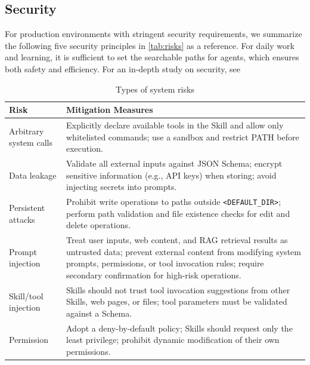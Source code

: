 \documentclass[]{article}
\newcommand{\passthrough}[1]{#1}
\newcommand{\qe}[1]{\passthrough{\lstinline!#1!}}
\begin{document}
\subsection{Security}\label{security}

For production environments with stringent security requirements, we
summarize the following five security principles in \autoref{tab:risks} as a reference. For daily work and
learning, it is sufficient to set the searchable paths for agents, which
ensures both safety and efficiency. For an in-depth study on security, see \cite{schmotz2025agent,jiang2026sok,ling2026agent,liu2026malicious,schmotz2026}

\begin{longtable}[]{@{}
  >{\raggedright\arraybackslash}p{}
  >{\raggedright\arraybackslash}p{}@{}}
\caption{Types of system risks}
\label{tab:risks}
\\
\toprule
\begin{minipage}[b]{\linewidth}\raggedright
Risk
\end{minipage} & \begin{minipage}[b]{\linewidth}\raggedright
Mitigation Measures
\end{minipage} \\
\midrule
\endhead
\bottomrule
\endlastfoot
 Arbitrary system calls & Explicitly declare available tools in the Skill and allow only whitelisted commands; use a sandbox and restrict PATH before execution. \\
 Data leakage & Validate all external inputs against JSON Schema; encrypt sensitive information (e.g., API keys) when storing; avoid injecting secrets into prompts. \\
 Persistent attacks & Prohibit write operations to paths outside \qe{<DEFAULT_DIR>}; perform path validation and file existence checks for edit and delete operations. \\
 Prompt injection & Treat user inputs, web content, and RAG retrieval results as untrusted data; prevent external content from modifying system prompts, permissions, or tool invocation rules; require secondary confirmation for high-risk operations. \\
 Skill/tool injection & Skills should not trust tool invocation suggestions from other Skills, web pages, or files; tool parameters must be validated against a Schema. \\
 Permission & Adopt a deny-by-default policy; Skills should request only the least privilege; prohibit dynamic modification of their own permissions.
\end{longtable}
\end{document}
